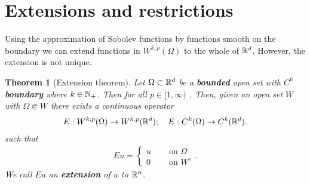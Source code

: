 \documentclass[12pt]{article}
\newtheorem{theorem}{Theorem}
\theoremstyle{remark}
\begin{document}
\section{Extensions and restrictions}\label{extension section}
Using the approximation of Sobolev functions by functions smooth on the boundary we can extend  functions in $W^{k,p}(\Omega)$ to the whole of  $\mathbb{R}^d$. However, the extension is not unique.
\begin{theorem}[Extension theorem]\label{extension}
	Let $\Omega\subset \mathbb{R}^d$ be a \textbf{bounded} open set with \textbf{$C^k$} \textbf{ boundary } where $k \in \mathbb{N}_+$.  Then for all $ p \in [1,\infty)$ . Then, given an open set $W$ with $\Omega \Subset W$ there exists a continuous operator
	\begin{align*}
		E: W^{k,p}(\Omega)\to W^{k,p}(\mathbb{R}^d); \quad E: C^{k}(\Omega)\to C^k(\mathbb{R}^d).
	\end{align*}
	such that
	\begin{align*}
		Eu = \begin{cases}
			     u \quad & \text{ on  }  \Omega \\
			     0 \quad & \text{ on }  W^c
		     \end{cases}.
	\end{align*}
	We call $E u$ an  \textbf{extension}  of $u$ to $\mathbb{R}^n$.
\end{theorem}
\end{document}
